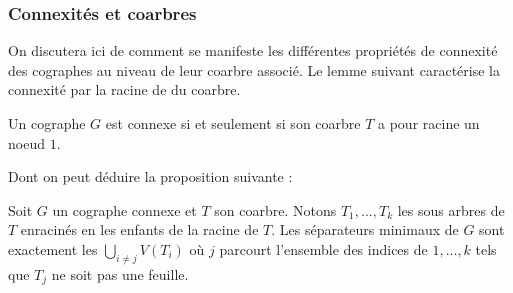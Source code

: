 \documentclass{scrartcl}
\begin{document}
\begin{flushleft}
\begin{figure}[h]
\begin{center}
    \end{center}
\end{figure}

\subsubsection{Connexités et coarbres}

On discutera ici de comment se manifeste les différentes propriétés de connexité des cographes au niveau de leur coarbre associé. Le lemme
suivant caractérise la connexité par la racine de du coarbre.

\begin{lem}
    Un cographe $G$ est connexe si et seulement si son coarbre $T$ a pour racine un noeud $1$.
\end{lem}

Dont on peut déduire la proposition suivante :

\begin{prop}\label{sepcographe}
    Soit $G$ un cographe connexe et $T$ son coarbre. Notons $T_1, ..., T_k$ les sous arbres de $T$ enracinés en les enfants de la racine de $T$.
    Les séparateurs minimaux de $G$ sont exactement les $\displaystyle \bigcup_{i \neq j} V(T_i)$ où $j$ parcourt l'ensemble des indices de $1, ..., k$
    tels que $T_j$ ne soit pas une feuille.
\end{prop}


\end{flushleft}
\end{document}
